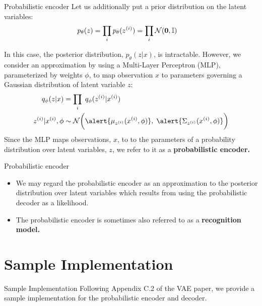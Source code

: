 \documentclass[10pt]{beamer}
\newcommand{\alatent}{z^{(i)} }
\newcommand{\N}{\mathcal{N}}
\newcommand{\I}{\mathbb{I}}
\begin{document}
\begin{frame}{Probabilistic encoder} 
\pause 
\footnotesize
Let us additionally put a prior distribution on the latent variables:
\begin{align*}
p_\theta(z) &= \ds\prod_i  p_\theta(\alatent) = \ds\prod_i  \N(\+0, \I) 
\end{align*}
\pause 

In this case, the posterior distribution, $p_
\theta(z| x)$, is intractable.
\vfill
\pause 
However, we consider an approximation 
by using a Multi-Layer Perceptron (MLP), parameterized by weights $\phi$, to map observation $x$ to  \alert{parameters} governing a Gaussian distribution of latent variable $z$: 
\begin{align}
 q_\phi(z| x) &=  \ds\prod_i \; q_\phi(\alatent| x^{(i)}) \nonumber \\
\alatent| x^{(i)}, \phi &\sim \N \bigg( \alert{\mu_{\alatent} (x^{(i)}, \phi)} , \; \alert{\Sigma_{\alatent} (x^{(i)}, \phi)}  \bigg) \label{approx_posterior} 
\end{align}
\pause 
 Since the MLP maps observations, $x$, to to the parameters of a probability distribution over latent variables, $z$, we refer to it as a \bf{probabilistic encoder.} 
 
\end{frame}

\begin{frame}{Probabilistic encoder} 

\begin{itemize}
\item  We may regard the probabilistic encoder as an approximation to the posterior distribution over latent variables which
results from using the probabilistic decoder as a likelihood.
\item The probabilistic encoder is sometimes also referred to as a \bf{recognition model}.
\end{itemize}

\end{frame}

\section{Sample Implementation}

\begin{frame}{Sample Implementation}
Following Appendix C.2 of the VAE paper, we provide a sample implementation for the probabilistic encoder and decoder. 
\end{frame}
\end{document}
